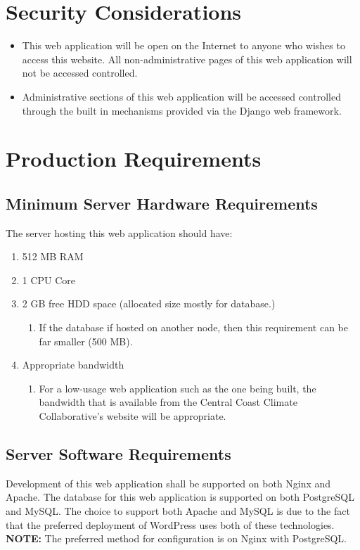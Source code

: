 \documentclass[11pt, hidelinks, letterpaper, obeyspaces]{article}
\newcommand{\clientName}{Central Coast Climate Collaborative}
\renewenvironment{leftbar}{%
  \def\FrameCommand{\vrule width 0.8pt \hspace{10pt}}%
  \MakeFramed {\advance\hsize-\width \FrameRestore}}%
 {\endMakeFramed}
\begin{document}
\section{Security Considerations}\thispagestyle{fancy}
\begin{itemize}
  \item This web application will be open on the Internet to anyone  who wishes
  to access this website. All non-administrative pages of this web application
  will not be accessed controlled.
  \item Administrative sections of this web application will be accessed
  controlled through the built in mechanisms provided via the Django web
  framework.
\end{itemize}
\section{Production Requirements}\thispagestyle{fancy}
\subsection{Minimum Server Hardware Requirements}
The server hosting this web application should have:
\begin{enumerate}
  \item 512 MB RAM
  \item 1 CPU Core
  \item 2 GB free HDD space (allocated size mostly for database.)
  \begin{enumerate}
    \item If the database if hosted on another node, then this requirement can
    be far smaller (500 MB).
  \end{enumerate}
  \item Appropriate bandwidth
  \begin{enumerate}
    \item For a low-usage web application such as the one being built, the
    bandwidth that is available from the \clientName's website will be
    appropriate.
  \end{enumerate}
\end{enumerate}
\subsection{Server Software Requirements}
Development of this web application shall be supported on both Nginx and Apache.
The database for this web application is supported on both PostgreSQL and MySQL.
The choice to support both Apache and MySQL is due to the fact that the
preferred deployment of WordPress uses both of these technologies.
\begin{leftbar}
  \noindent\textbf{NOTE: }The preferred method for configuration is on
  Nginx with PostgreSQL.
\end{leftbar}
\end{document}
